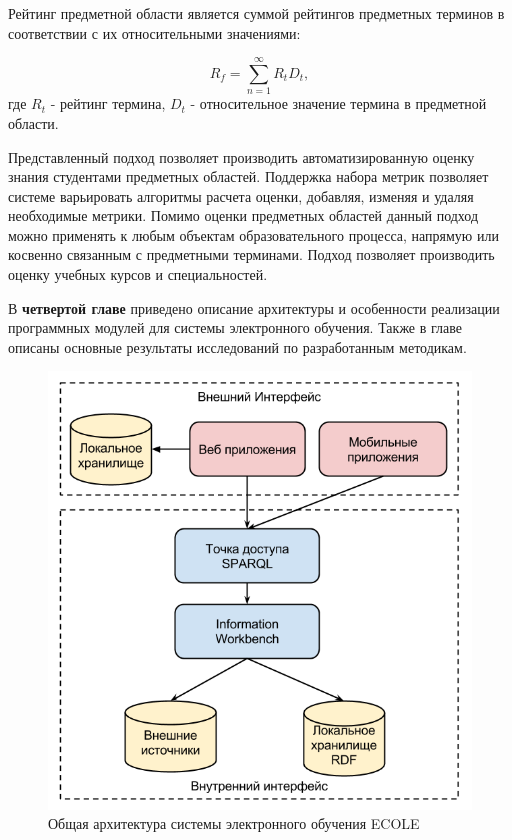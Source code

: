 Рейтинг предметной области является суммой рейтингов предметных терминов в соответствии с их относительными значениями:

$$
    R_f = \sum_{n=1}^{\infty} R_tD_t,
$$
где \(R_t\) - рейтинг термина, \(D_t\) - относительное значение термина в предметной области.

Представленный подход позволяет производить автоматизированную оценку знания студентами предметных областей. Поддержка набора метрик позволяет системе варьировать алгоритмы расчета оценки, добавляя, изменяя и удаляя необходимые метрики. Помимо оценки предметных областей данный подход можно применять к любым объектам образовательного процесса, напрямую или косвенно связанным с предметными терминами. Подход позволяет производить оценку учебных курсов и специальностей.  

В \textbf{четвертой главе} приведено описание архитектуры и особенности реализации программных модулей для системы электронного обучения. Также в главе описаны основные результаты исследований по разработанным методикам.

\begin{figure}[ht] 
  \center
  \includegraphics[scale=0.40]{OverallArch}
  \caption{Общая архитектура системы электронного обучения ECOLE} 
  \label{fig:OverallArch}
\end{figure}


